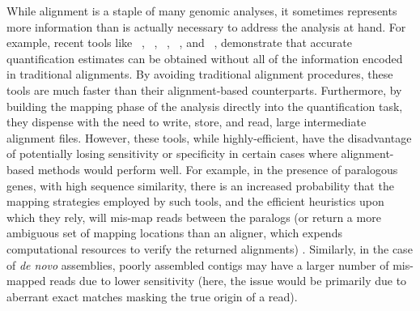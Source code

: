 While alignment is a staple of many genomic analyses, it sometimes represents more 
information than is actually necessary to address the analysis at hand. For example, 
recent tools like \sailfish~\citep{Patro2014Sailfish}, \rnaskim~\citep{zhang2014rna}, 
\kallisto~\citep{Bray2016Kallisto}, \salmon~\citep{Patro2017Salmon}, and 
\fleximer~\citep{ju2017fleximer}, demonstrate that accurate quantification estimates can 
be obtained without all of the information encoded in traditional alignments. By avoiding 
traditional alignment procedures, these tools are much faster than their alignment-based 
counterparts. Furthermore, by building the mapping phase of the analysis directly into the 
quantification task, they dispense with the need to  write, store, and read, large 
intermediate alignment files. However, these \nab tools, while highly-efficient, have 
the disadvantage of potentially losing sensitivity or specificity in certain cases where 
alignment-based methods would perform well. For example, in the presence of paralogous 
genes, with high sequence similarity, there is an increased probability that the mapping 
strategies employed by such tools, and the efficient heuristics upon which they rely, will 
mis-map reads between the paralogs (or return a more ambiguous set of mapping locations 
than an aligner, which expends computational resources to verify the returned alignments) 
\citep{axtell2014butter}. Similarly, in the case of \textit{de novo} assemblies, poorly 
assembled contigs may have a larger number of mis-mapped reads due to lower sensitivity 
(here, the issue would be primarily due to aberrant exact matches masking the true origin 
of a read).

